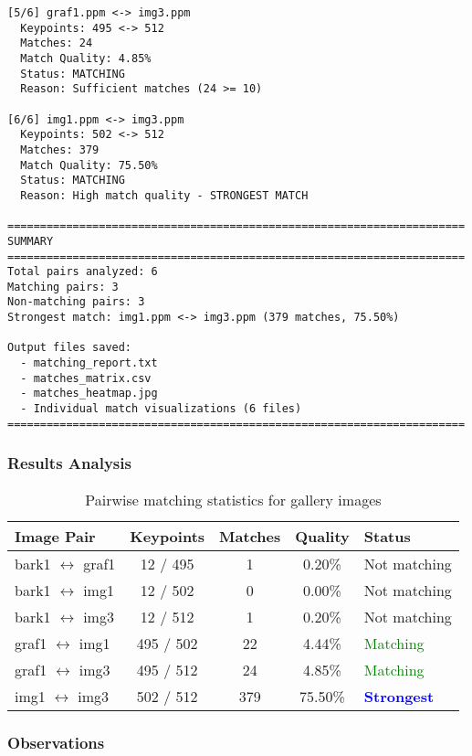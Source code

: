 \documentclass[12pt,a4paper]{article}
\begin{document}
\begin{lstlisting}
[5/6] graf1.ppm <-> img3.ppm
  Keypoints: 495 <-> 512
  Matches: 24
  Match Quality: 4.85%
  Status: MATCHING
  Reason: Sufficient matches (24 >= 10)

[6/6] img1.ppm <-> img3.ppm
  Keypoints: 502 <-> 512
  Matches: 379
  Match Quality: 75.50%
  Status: MATCHING
  Reason: High match quality - STRONGEST MATCH

======================================================================
SUMMARY
======================================================================
Total pairs analyzed: 6
Matching pairs: 3
Non-matching pairs: 3
Strongest match: img1.ppm <-> img3.ppm (379 matches, 75.50%)

Output files saved:
  - matching_report.txt
  - matches_matrix.csv
  - matches_heatmap.jpg
  - Individual match visualizations (6 files)
======================================================================
\end{lstlisting}

\subsubsection{Results Analysis}

\begin{table}[H]
\centering
\begin{tabular}{@{}lcccp{4cm}@{}}
\toprule
\textbf{Image Pair} & \textbf{Keypoints} & \textbf{Matches} & \textbf{Quality} & \textbf{Status} \\
\midrule
bark1 $\leftrightarrow$ graf1 & 12 / 495 & 1 & 0.20\% & Not matching \\
bark1 $\leftrightarrow$ img1 & 12 / 502 & 0 & 0.00\% & Not matching \\
bark1 $\leftrightarrow$ img3 & 12 / 512 & 1 & 0.20\% & Not matching \\
graf1 $\leftrightarrow$ img1 & 495 / 502 & 22 & 4.44\% & \textcolor{green}{Matching} \\
graf1 $\leftrightarrow$ img3 & 495 / 512 & 24 & 4.85\% & \textcolor{green}{Matching} \\
img1 $\leftrightarrow$ img3 & 502 / 512 & 379 & 75.50\% & \textcolor{blue}{\textbf{Strongest}} \\
\bottomrule
\end{tabular}
\caption{Pairwise matching statistics for gallery images}
\end{table}

\subsubsection{Observations}
\end{document}
